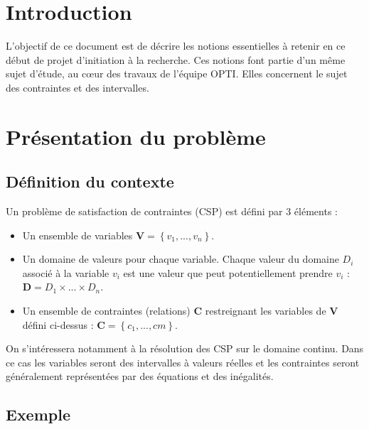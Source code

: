 \section{Introduction }
L'objectif de ce document est de décrire les notions essentielles à retenir en ce début de projet d'initiation à la recherche. Ces notions font partie d'un même sujet d'étude, au cœur des travaux de l'équipe \textsc{OPTI}. Elles concernent le sujet des contraintes et des intervalles. %

\section{Présentation du problème}
\subsection{Définition du contexte}
Un problème de satisfaction de contraintes (\textsc{CSP}) est défini par 3 éléments : 
\begin{itemize}
\item
Un ensemble de variables $\mathbf{V} = \left\{ v_1,...,v_n \right\}$.
\item
Un domaine de valeurs pour chaque variable. Chaque valeur du domaine $D_i$ associé à la variable $v_i$ est une valeur que peut potentiellement prendre $v_i$ : $\mathbf{D} = D_1 \times ... \times D_n $.
\item
Un ensemble de contraintes (relations) $\mathbf{C}$ restreignant les variables de $\mathbf{V}$ défini ci-dessus :  $\mathbf{C} = \left\{c_1,...,cm\right\}$. 
\end{itemize}
\vspace{1.5cm}
On s'intéressera notamment à la résolution des \textsc{CSP} sur le domaine continu. Dans ce cas les variables seront des intervalles à valeurs réelles et les contraintes seront généralement représentées par des équations et des inégalités. 

\clearpage
\subsection{Exemple}

